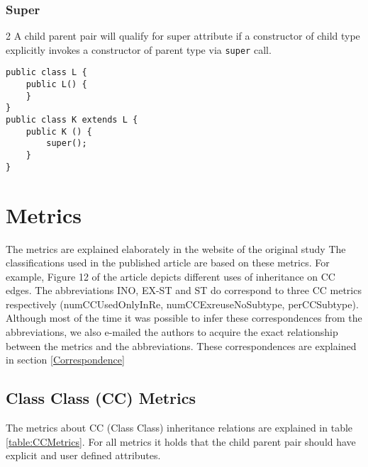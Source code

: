\documentclass{uvamscse}
\begin{document}
\subsection{Super}
\begin{multicols} {2}
A child parent pair will qualify for super attribute if a constructor of child type explicitly invokes a constructor of parent type via \texttt{super} call.
\columnbreak
\begin{verbatim}
public class L {
    public L() {
    }
}
public class K extends L {
    public K () {
   	    super();
   	}
}
\end{verbatim}
\end{multicols}


\chapter{Metrics}
The metrics are explained elaborately in the website of the original study \cite{InheritanceUseWeb}  The classifications used in the published article are based on these metrics. For example, Figure 12 of the article depicts different uses of inheritance on CC edges. The abbreviations INO, EX-ST and ST do correspond to three CC metrics respectively (numCCUsedOnlyInRe, numCCExreuseNoSubtype, perCCSubtype). Although most of the time it was possible to infer these correspondences from the abbreviations, we also e-mailed the authors to acquire the exact relationship between the metrics and the abbreviations. These correspondences are explained in section \ref{Correspondence}




\section{Class Class (CC) Metrics}
The metrics about CC (Class Class) inheritance relations are explained in table \ref{table:CCMetrics}. For all metrics it holds that the child parent pair should have explicit and user defined attributes.
\end{document}
